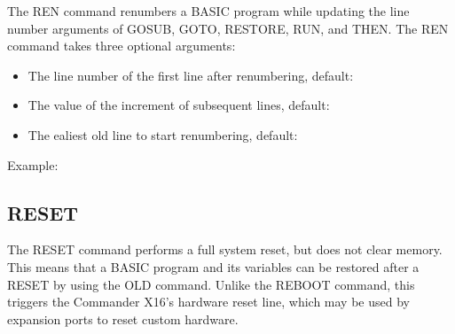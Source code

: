 The {\ttfamily REN} command renumbers a BASIC program while updating the line
number arguments of {\ttfamily GOSUB}, {\ttfamily GOTO}, {\ttfamily RESTORE},
{\ttfamily RUN}, and {\ttfamily THEN}.  The {\ttfamily REN} command takes three
optional arguments:\\

\begin{itemize}

	\item The line number of the first line after renumbering, default: {}

	\item The value of the increment of subsequent lines, default: {}

	\item The ealiest old line to start renumbering, default: {}

\end{itemize}

\vspace{16pt}

Example:\\


\subsection{RESET}

The {\ttfamily RESET} command performs a full system reset, but does not clear
memory.  This means that a BASIC program and its variables can be restored
after a {\ttfamily RESET} by using the {\ttfamily OLD} command.  Unlike the
{\ttfamily REBOOT} command, this triggers the Commander X16's hardware reset
line, which may be used by expansion ports to reset custom hardware.\\

